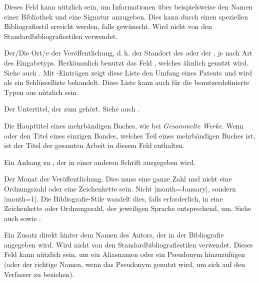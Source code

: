 \documentclass{ltxdockit}[2011/03/25]
\begin{document}
\begin{fieldlist}

Dieses Feld kann nützlich sein, um Informationen über beispielsweise den Namen
einer Bibliothek und eine Signatur anzugeben. Dies kann durch einen speziellen
Bibliografiestil erreicht werden, falls gewünscht. Wird nicht von den
Standardbibliografiestilen  verwendet.


Der/Die Ort/e der Veröffentlichung, d.\,h. der Standort des 
oder der , je nach Art des Eingabetyps. Herkömmlich
benutzt \bibtex das Feld , welches ähnlich genutzt wird. Siehe
auch . Mit -Einträgen zeigt
diese Liste den Umfang eines Patents und wird als ein Schlüsselliste behandelt.
Diese Liste kann auch für die benutzerdefinierte Typen aus 
nützlich sein.


Der Untertitel, der zum  gehört. Siehe auch
.


Die Haupttitel eines mehrbändigen Buches, wie bei \emph{Gesammelte Werke}.
Wenn  oder  den Titel eines einzigen Bandes,
welches Teil eines mehrbändigen Buches ist, ist der Titel der gesamten Arbeit in
diesem Feld enthalten.


Ein Anhang zu , der in einer anderen Schrift ausgegeben
wird.


Der Monat der Veröffentlichung. Dies muss eine ganze Zahl und nicht eine
Ordnungszahl oder eine Zeichenkette sein. Nicht |month={January}|, sondern
|month={1}|. Die Bibliografie-Stile wandelt dies, falls erforderlich, in eine
Zeichenkette oder Ordnungszahl, der jeweiligen Sprache entsprechend, um. Siehe
auch  sowie .


Ein Zusatz direkt hinter dem Namen des Autors, der in der Bibliografie
angegeben wird. Wird nicht von den Standardbibliografiestilen  verwendet.
Dieses Feld kann nützlich sein, um ein Aliasnamen oder ein Pseudonym
hinzuzufügen (oder der richtige Namen, wenn das Pseudonym genutzt wird, um sich
auf den Verfasser zu beziehen).


\end{fieldlist}
\end{document}
